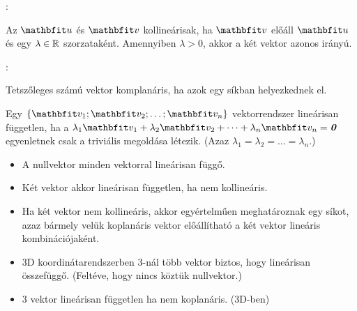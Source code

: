 \documentclass[a4paper, 12pt]{scrartcl}
\begin{document}
\begin{blueBox}
  :

  Az $\rvec u$ és $\rvec v$ kollineárisak, ha $\rvec v$ előáll $\rvec u$ és egy
  $\lambda \in \mathbb{R}$ szorzataként. Amennyiben $\lambda > 0$, akkor a két
  vektor azonos irányú.
\end{blueBox}

\begin{blueBox}
  :

  Tetszőleges számú vektor komplanáris, ha azok egy síkban helyezkednek el.
\end{blueBox}

\begin{definition}
  Egy $\{ \rvec v_1; \rvec v_2; \dots; \rvec v_n \}$ vektorrendszer lineárisan
  független, ha a $ \lambda_1 \rvec v_1 + \lambda_2 \rvec v_2 + \dots + \lambda_n
    \rvec v_n = \nvec $ egyenletnek csak a triviális megoldása létezik. (Azaz
  $\lambda_1 = \lambda_2 = \dots = \lambda_n$.)
\end{definition}

\begin{note}
  \begin{itemize}
    \item A nullvektor minden vektorral lineárisan függő.
    \item Két vektor akkor lineárisan független, ha nem kollineáris.
    \item Ha két vektor nem kollineáris, akkor egyértelműen meghatároznak egy
          síkot, azaz bármely velük koplanáris vektor előállítható a két vektor
          lineáris kombinációjaként.
    \item 3D koordinátarendszerben 3-nál több vektor biztos, hogy lineárisan
          összefüggő. (Feltéve, hogy nincs köztük nullvektor.)
    \item 3 vektor lineárisan független ha nem koplanáris. (3D-ben)
  \end{itemize}
\end{note}
\end{document}
